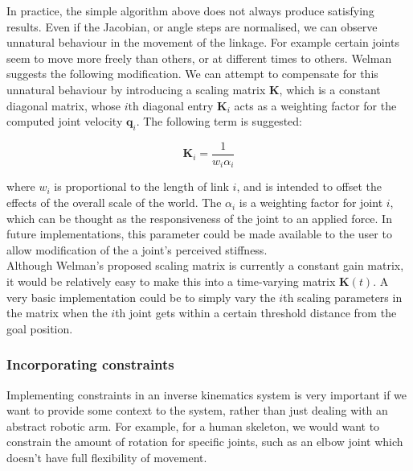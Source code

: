 \documentclass[paper=a4, fontsize=11pt]{scrartcl} %
\numberwithin{equation}{section} %
\numberwithin{figure}{section} %
\numberwithin{table}{section} %
\newcommand{\vect}[1]{\mathbf{#1}}
\begin{document}
In practice, the simple algorithm above does not always produce satisfying results. Even if the Jacobian, or angle steps are normalised, we can observe unnatural behaviour in the movement of the linkage. For example certain joints seem to move more freely than others, or at different times to others. Welman \cite{Welman1993} suggests the following modification. We can attempt to compensate for this unnatural behaviour by introducing a scaling matrix $\vect{K}$, which is a constant diagonal matrix, whose $i \text{th}$ diagonal entry $\vect{K}_i$ acts as a weighting factor for the computed joint velocity $\vect{q}_i$. The following term is suggested:

\begin{equation}
\vect{K}_i = \frac{1}{w_i \alpha_i}
\end{equation}

where $w_i$ is proportional to the length of link $i$, and is intended to offset the effects of the overall scale of the world. The $\alpha_i$ is a weighting factor for joint $i$, which can be thought as the responsiveness of the joint to an applied force. In future implementations, this parameter could be made available to the user to allow modification of the a joint's perceived stiffness. \\

Although Welman's proposed scaling matrix is currently a constant gain matrix, it would be relatively easy to make this into a time-varying matrix $\vect{K}(t)$. A very basic implementation could be to simply vary the $i$th scaling parameters in the matrix when the $i$th joint gets within a certain threshold distance from the goal position.

\subsubsection{Incorporating constraints}

Implementing constraints in an inverse kinematics system is very important if we want to provide some context to the system, rather than just dealing with an abstract robotic arm. For example, for a human skeleton, we would want to constrain the amount of rotation for specific joints, such as an elbow joint which doesn't have full flexibility of movement. \\
\end{document}
